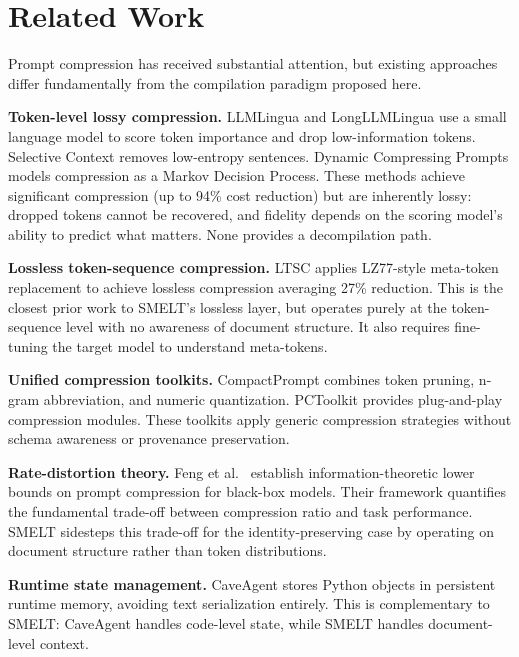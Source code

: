 \documentclass[11pt,a4paper]{article}
\begin{document}
\section{Related Work}

Prompt compression has received substantial attention, but existing approaches differ fundamentally from the compilation paradigm proposed here.

\textbf{Token-level lossy compression.} LLMLingua \citep{llmlingua2023} and LongLLMLingua \citep{longllmlingua2023} use a small language model to score token importance and drop low-information tokens. Selective Context \citep{selectivecontext2023} removes low-entropy sentences. Dynamic Compressing Prompts \citep{dcp2025} models compression as a Markov Decision Process. These methods achieve significant compression (up to 94\% cost reduction) but are inherently lossy: dropped tokens cannot be recovered, and fidelity depends on the scoring model's ability to predict what matters. None provides a decompilation path.

\textbf{Lossless token-sequence compression.} LTSC \citep{ltsc2025} applies LZ77-style meta-token replacement to achieve lossless compression averaging 27\% reduction. This is the closest prior work to SMELT's lossless layer, but operates purely at the token-sequence level with no awareness of document structure. It also requires fine-tuning the target model to understand meta-tokens.

\textbf{Unified compression toolkits.} CompactPrompt \citep{compactprompt2025} combines token pruning, n-gram abbreviation, and numeric quantization. PCToolkit \citep{pctoolkit2024} provides plug-and-play compression modules. These toolkits apply generic compression strategies without schema awareness or provenance preservation.

\textbf{Rate-distortion theory.} Feng et al.\ \citep{ratedistortion2024} establish information-theoretic lower bounds on prompt compression for black-box models. Their framework quantifies the fundamental trade-off between compression ratio and task performance. SMELT sidesteps this trade-off for the identity-preserving case by operating on document structure rather than token distributions.

\textbf{Runtime state management.} CaveAgent \citep{caveagent2026} stores Python objects in persistent runtime memory, avoiding text serialization entirely. This is complementary to SMELT: CaveAgent handles code-level state, while SMELT handles document-level context.
\end{document}
